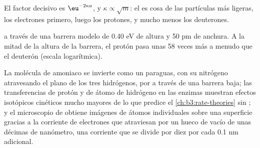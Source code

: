 El factor decisivo es $\eu^{-2\kappa a}$, y $\kappa \propto \sqrt m$:
el  es cosa de las partículas más ligeras, los electrones primero, luego
los protones, y mucho menos los deuterones.

\begin{omfigure}

{\small {} a través de una barrera modelo de 0.40 eV de altura y
50 pm de anchura. A la mitad de la altura de la barrera, el protón pasa unas 58 veces
más a menudo que el deuterón (escala logarítmica).}
\end{omfigure}

\begin{remark}\label{rem:b3:quantum-model-systems:where}
La molécula de amoniaco se invierte como un paraguas, con su nitrógeno atravesando el
plano de los tres hidrógenos, por  a través de una barrera baja; las transferencias
de protón y de átomo de hidrógeno en las enzimas muestran efectos isotópicos cinéticos mucho
mayores de lo que predice el \cref{ch:b3:rate-theories} sin ; y el
microscopio de  obtiene imágenes de átomos individuales sobre una superficie gracias a la
corriente de electrones que atraviesan por  un hueco de vacío de unas décimas de
nanómetro, una corriente que se divide por diez por cada 0.1 nm adicional.
\end{remark}


